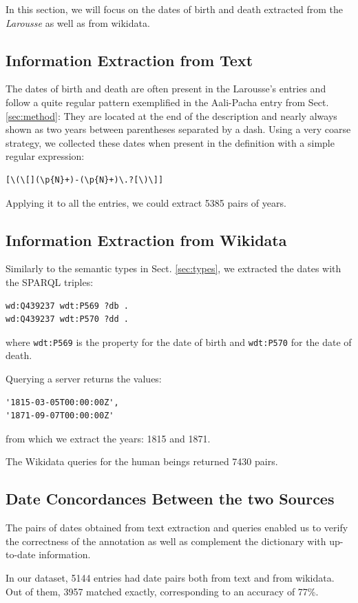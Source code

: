 \documentclass[10pt, a4paper]{article}
\begin{document}
In this section, we will focus on the dates of birth and death extracted from the \textit{Larousse} as well as from wikidata. 

\subsection{Information Extraction from Text}
The dates of birth and death are often present in the Larousse's entries and follow a quite regular pattern exemplified in the Aali-Pacha entry from Sect. \ref{sec:method}: They are located at the end of the description and nearly always shown as two years between parentheses separated by a dash. Using a very coarse strategy, we collected these dates when present in the definition with a simple regular expression:
\begin{verbatim}
[\(\[](\p{N}+)-(\p{N}+)\.?[\)\]]
\end{verbatim}

Applying it to all the entries, we could extract 5385 pairs of years.

\subsection{Information Extraction from Wikidata}
Similarly to the semantic types in Sect. \ref{sec:types}, we extracted the dates with the SPARQL triples:
\begin{verbatim}
wd:Q439237 wdt:P569 ?db .
wd:Q439237 wdt:P570 ?dd .
\end{verbatim}
where \verb=wdt:P569= is the property for the date of birth and \verb=wdt:P570= for the date of death.

Querying a server returns the values:
\begin{verbatim}
'1815-03-05T00:00:00Z',
'1871-09-07T00:00:00Z'
\end{verbatim}
from which we extract the years: 1815 and 1871.

The Wikidata queries for the human beings returned 7430 pairs. 

\subsection{Date Concordances Between the two Sources}
The pairs of dates obtained from text extraction and queries enabled us to verify the correctness of the annotation as well as complement the dictionary with up-to-date information.

In our dataset, 5144 entries had date pairs both from text and from wikidata. Out of them, 3957 matched exactly, corresponding to an accuracy of 77\%.
\end{document}
